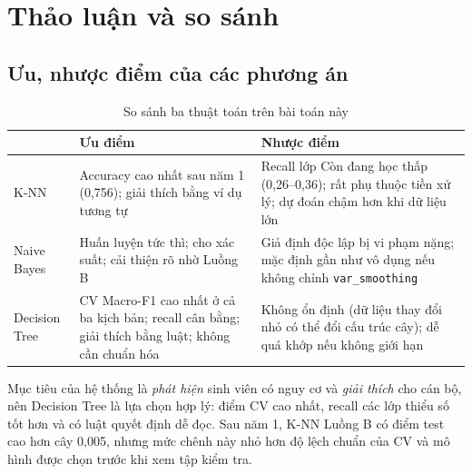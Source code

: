 \documentclass[12pt,a4paper,oneside]{report}
\newcommand{\code}[1]{\texttt{#1}}
\newcommand{\fone}{Macro-F1}
\begin{document}
\chapter{Thảo luận và so sánh}\label{ch:discuss}
\section{Ưu, nhược điểm của các phương án}
\begin{table}[H]
\centering
\caption{So sánh ba thuật toán trên bài toán này}\label{tab:proscons}
\begin{tabularx}{\textwidth}{@{}lXX@{}}
\toprule
 & \textbf{Ưu điểm} & \textbf{Nhược điểm}\\
\midrule
K-NN & Accuracy cao nhất sau năm 1 (0,756); giải thích bằng ví dụ tương tự & Recall lớp Còn đang học thấp (0,26--0,36); rất phụ thuộc tiền xử lý; dự đoán chậm hơn khi dữ liệu lớn\\
Naive Bayes & Huấn luyện tức thì; cho xác suất; cải thiện rõ nhờ Luồng B & Giả định độc lập bị vi phạm nặng; mặc định gần như vô dụng nếu không chỉnh \code{var\_smoothing}\\
Decision Tree & CV \fone{} cao nhất ở cả ba kịch bản; recall cân bằng; giải thích bằng luật; không cần chuẩn hóa & Không ổn định (dữ liệu thay đổi nhỏ có thể đổi cấu trúc cây); dễ quá khớp nếu không giới hạn\\
\bottomrule
\end{tabularx}
\end{table}
Mục tiêu của hệ thống là \emph{phát hiện} sinh viên có nguy cơ và \emph{giải thích} cho cán bộ, nên Decision Tree là lựa chọn
hợp lý: điểm CV cao nhất, recall các lớp thiểu số tốt hơn và có luật quyết định dễ đọc. Sau năm 1, K-NN Luồng B có điểm
test cao hơn cây 0,005, nhưng mức chênh này nhỏ hơn độ lệch chuẩn của CV và mô hình được chọn trước khi xem tập kiểm tra.
\end{document}
